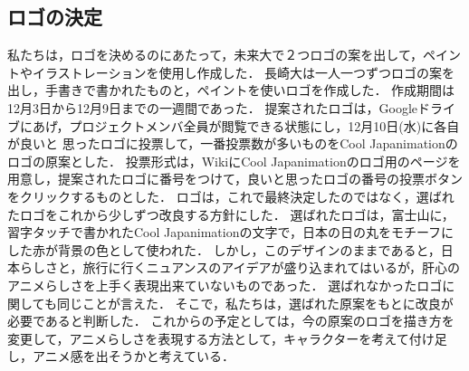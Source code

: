 \subsection{ロゴの決定}
\par
私たちは，ロゴを決めるのにあたって，未来大で２つロゴの案を出して，ペイントやイラストレーションを使用し作成した．
長崎大は一人一つずつロゴの案を出し，手書きで書かれたものと，ペイントを使いロゴを作成した．
作成期間は12月3日から12月9日までの一週間であった．
提案されたロゴは，Googleドライブにあげ，プロジェクトメンバ全員が閲覧できる状態にし，12月10日(水)に各自が良いと
思ったロゴに投票して，一番投票数が多いものをCool Japanimationのロゴの原案とした．
投票形式は，WikiにCool Japanimationのロゴ用のページを用意し，提案されたロゴに番号をつけて，良いと思ったロゴの番号の投票ボタンをクリックするものとした．
ロゴは，これで最終決定したのではなく，選ばれたロゴをこれから少しずつ改良する方針にした．
選ばれたロゴは，富士山に，習字タッチで書かれたCool Japanimationの文字で，日本の日の丸をモチーフにした赤が背景の色として使われた．
しかし，このデザインのままであると，日本らしさと，旅行に行くニュアンスのアイデアが盛り込まれてはいるが，肝心のアニメらしさを上手く表現出来ていないものであった．
選ばれなかったロゴに関しても同じことが言えた．
そこで，私たちは，選ばれた原案をもとに改良が必要であると判断した．
これからの予定としては，今の原案のロゴを描き方を変更して，アニメらしさを表現する方法として，キャラクターを考えて付け足し，アニメ感を出そうかと考えている．
